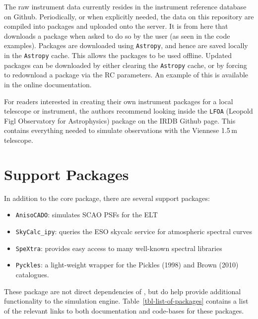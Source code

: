 The raw instrument data currently resides in the instrument reference database on Github.
Periodically, or when explicitly needed, the data on this repository are compiled into packages and uploaded onto the \ScopeSim{} server.
It is from here that \ScopeSim{} downloads a package when asked to do so by the user (as seen in the code examples).
Packages are downloaded using \lstinline{Astropy}, and hence are saved locally in the \lstinline{Astropy} cache.
This allows the packages to be used offline.
Updated packages can be downloaded by either clearing the \lstinline{Astropy} cache, or by forcing \scopesim{} to redownload a package via the RC parameters.
An example of this is available in the online documentation.

For readers interested in creating their own instrument packages for a local telescope or instrument, the authors recommend looking inside the \lstinline{LFOA} (Leopold Figl Observatory for Astrophysics) package on the IRDB Github page.
This contains everything needed to simulate observations with the Viennese 1.5\,m telescope.



\section{Support Packages}
\label{support-packages}

In addition to the core package, there are several support packages:

\begin{itemize}
\item \lstinline{AnisoCADO}: simulates SCAO PSFs for the ELT

\item \lstinline{SkyCalc_ipy}: queries the ESO skycalc service for atmospheric spectral curves

\item \lstinline{SpeXtra}: provides easy access to many well-known spectral libraries

\item \lstinline{Pyckles}: a light-weight wrapper for the Pickles (1998) and Brown (2010) catalogues.
\end{itemize}

These package are not direct dependencies of \ScopeSim{}, but do help provide additional functionality to the simulation engine.
Table~\ref{tbl-list-of-packages} contains a list of the relevant links to both documentation and code-bases for these packages.


